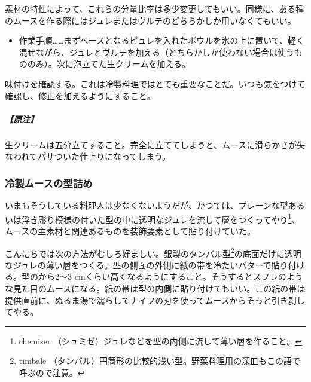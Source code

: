 \begin{recette}
素材の特性によって、これらの分量比率は多少変更してもいい。同様に、ある種のムースを作る際にはジュレまたはヴルテのどちらかしか用いなくてもいい。

\begin{itemize}
\tightlist
\item
  作業手順\ldots{}\ldots{}まずベースとなるピュレを入れたボウルを氷の上に置いて、軽く混ぜながら、ジュレとヴルテを加える（どちらかしか使わない場合は使うもののみ）。次に泡立てた生クリームを加える。
\end{itemize}

味付けを確認する。これは冷製料理ではとても重要なことだ。いつも気をつけて確認し、修正を加えるようにすること。

\hypertarget{nota-composition-de-l-appareil-pour-mousses-et-mousseline-froides}{%
\subparagraph{【原注】}\label{nota-composition-de-l-appareil-pour-mousses-et-mousseline-froides}}

生クリームは五分立てすること。完全に立ててしまうと、ムースに滑らかさが失なわれてパサついた仕上りになってしまう。

\hypertarget{moulage-des-mousses-froides}{%
\subsubsection{冷製ムースの型詰め}\label{moulage-des-mousses-froides}}



いまもそうしている料理人は少なくないようだが、かつては、プレーンな型あるいは浮き彫り模様の付いた型の中に透明なジュレを流して層をつくってやり\footnote{chemiser
  （シュミゼ）ジュレなどを型の内側に流して薄い層を作ること。}、ムースの主素材と関連あるものを装飾要素として貼り付けていた。

こんにちでは次の方法がむしろ好ましい。銀製のタンバル型\footnote{timbale
  （タンバル）円筒形の比較的浅い型。野菜料理用の深皿もこの語で呼ぶので注意。}の底面だけに透明なジュレの薄い層をつくる。型の側面の外側に紙の帯を冷たいバターで貼り付ける。型のから2〜3
cmくらい高くなるようにすること。そうするとスフレのような見た目のムースになる。紙の帯は型の内側に貼り付けてもいい。この紙の帯は提供直前に、ぬるま湯で濡らしてナイフの刃を使ってムースからそっと引き剥してやる。


\end{recette}
